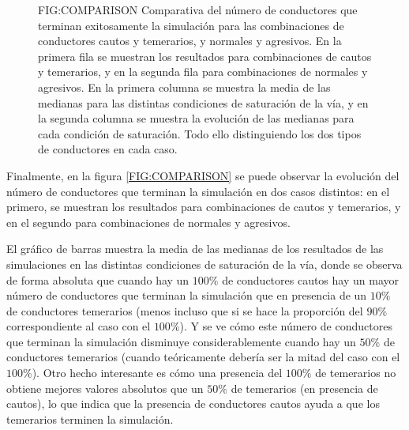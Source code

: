 \begin{figure}[Conductores que terminan en Cautos/Temerarios y Normales/Agresivos]{FIG:COMPARISON}{
    Comparativa del número de conductores que terminan exitosamente la simulación para las combinaciones de conductores cautos y temerarios, y normales y agresivos.
    En la primera fila se muestran los resultados para combinaciones de cautos y temerarios, y en la segunda fila para combinaciones de normales y agresivos.
    En la primera columna se muestra la media de las medianas para las distintas condiciones de saturación de la vía, y en la segunda columna se muestra
    la evolución de las medianas para cada condición de saturación. Todo ello distinguiendo los dos tipos de conductores en cada caso.
    }
     \hspace{1cm}
     \vspace{1cm}

     \hspace{1cm}
\end{figure}

Finalmente, en la figura \ref{FIG:COMPARISON} se puede observar la evolución del número de conductores que terminan la simulación
en dos casos distintos: en el primero, se muestran los resultados para combinaciones de cautos y temerarios, y en el segundo para combinaciones de normales y agresivos.

El gráfico de barras muestra la media de las medianas de los resultados de las simulaciones en las distintas condiciones de saturación de la vía,
donde se observa de forma absoluta que cuando hay un $100\%$ de conductores cautos hay un mayor número de conductores que terminan la simulación
que en presencia de un $10\%$ de conductores temerarios (menos incluso que si se hace la proporción del $90\%$ correspondiente al caso con el $100\%$).
Y se ve cómo este número de conductores que terminan la simulación disminuye considerablemente
cuando hay un $50\%$ de conductores temerarios (cuando teóricamente debería ser la mitad del caso con el $100\%$).
Otro hecho interesante es cómo una presencia del $100\%$ de temerarios no obtiene mejores valores absolutos
que un $50\%$ de temerarios (en presencia de cautos), lo que indica que la presencia de conductores cautos ayuda a que los temerarios terminen la simulación.

